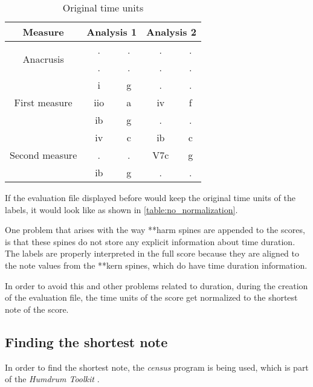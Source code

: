 		\begin{table}[tbp]
		\centering
		\begin{tabular}{|c|c|c|c|c|}
		\hline
		Measure & \multicolumn{2}{c|}{Analysis 1} & \multicolumn{2}{c|}{Analysis 2} \\ \hline
		\multirow{2}{*}{Anacrusis} & . & . & . & . \\ \cline{2-5}
		 & . & . & . & . \\ \hline
		\multirow{3}{*}{First measure} & i & g & . & . \\ \cline{2-5}
		 & iio & a & iv & f \\ \cline{2-5}
		 & ib & g & . & . \\ \hline
		\multirow{3}{*}{Second measure} & iv & c & ib & c \\ \cline{2-5}
		 & . & . & V7c & g \\ \cline{2-5}
		 & ib & g & . & . \\ \hline
		\end{tabular}
		\caption{Original time units}
		\label{table:no_normalization}
		\end{table}

		If the evaluation file displayed before would keep the original time units of the labels, it would look like as shown in \autoref{table:no_normalization}.

		One problem that arises with the way **harm spines are appended to the scores, is that these spines do not store any explicit information about time duration. The labels are properly interpreted in the full score because they are aligned to the note values from the **kern spines, which do have time duration information.

		In order to avoid this and other problems related to duration, during the creation of the evaluation file, the time units of the score get normalized to the shortest note of the score.

	\subsection{Finding the shortest note}
		In order to find the shortest note, the \emph{census} program is being used, which is part of the \emph{Humdrum Toolkit} \cite{humdrum}.

